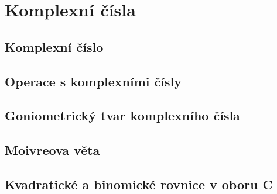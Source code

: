 
\newpage
    \section{Komplexní čísla}
        \subsection{Komplexní číslo}
        \subsection{Operace s komplexními čísly}
        \subsection{Goniometrický tvar komplexního čísla}
        \subsection{Moivreova věta}
        \subsection{Kvadratické a binomické rovnice v oboru C}